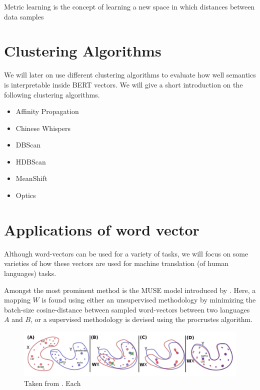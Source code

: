 \documentclass[a4paper,12pt,twoside,openright]{report}
\begin{document}
Metric learning is the concept of learning a new space in which distances between data samples 


\section{Clustering Algorithms}

We will later on use different clustering algorithms to evaluate how well semantics is interpretable inside BERT vectors.
We will give a short introduction on the following clustering algorithms.

\begin{itemize}
\item Affinity Propagation
\item Chinese Whispers
\item DBScan
\item HDBScan
\item MeanShift
\item Optics
\end{itemize}


\section{Applications of word vector}


Although word-vectors can be used for a variety of tasks, we will focus on some varieties of how these vectors are used for machine translation (of human languages) tasks.

Amongst the most prominent method is the MUSE model introduced by \cite{conneau17}.
Here, a mapping $W$ is found using either an unsupervised methodology by minimizing the batch-size cosine-distance between sampled word-vectors between two languages $A$ and $B$, or a supervised methodology is devised using the procrustes algorithm.

\begin{figure}[h]
	\center
  \includegraphics[width=\linewidth]{./assets/relatedwork/muse.png}
  \caption{Taken from \cite{conneau17}. Each }
  \label{fig:muse_translation}
\end{figure}
\end{document}
